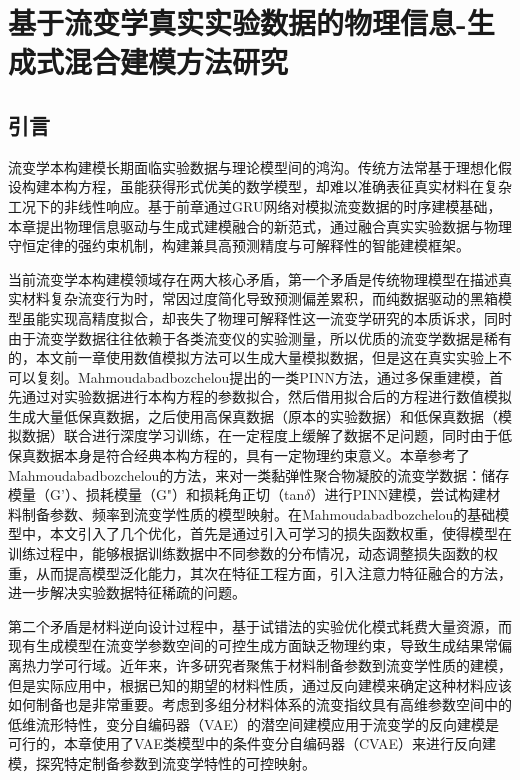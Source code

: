 \chapter{基于流变学真实实验数据的物理信息-生成式混合建模方法研究}
\section{引言}
流变学本构建模长期面临实验数据与理论模型间的鸿沟。传统方法常基于理想化假设构建本构方程，虽能获得形式优美的数学模型，却难以准确表征真实材料在复杂工况下的非线性响应。基于前章通过GRU网络对模拟流变数据的时序建模基础，本章提出物理信息驱动与生成式建模融合的新范式，通过融合真实实验数据与物理守恒定律的强约束机制，构建兼具高预测精度与可解释性的智能建模框架。

当前流变学本构建模领域存在两大核心矛盾，第一个矛盾是传统物理模型在描述真实材料复杂流变行为时，常因过度简化导致预测偏差累积，而纯数据驱动的黑箱模型虽能实现高精度拟合，却丧失了物理可解释性这一流变学研究的本质诉求，同时由于流变学数据往往依赖于各类流变仪的实验测量，所以优质的流变学数据是稀有的，本文前一章使用数值模拟方法可以生成大量模拟数据，但是这在真实实验上不可以复刻。Mahmoudabadbozchelou提出的一类PINN方法，通过多保重建模，首先通过对实验数据进行本构方程的参数拟合，然后借用拟合后的方程进行数值模拟生成大量低保真数据，之后使用高保真数据（原本的实验数据）和低保真数据（模拟数据）联合进行深度学习训练，在一定程度上缓解了数据不足问题，同时由于低保真数据本身是符合经典本构方程的，具有一定物理约束意义。本章参考了Mahmoudabadbozchelou的方法，来对一类黏弹性聚合物凝胶的流变学数据：储存模量（G'）、损耗模量（G"）和损耗角正切（tan$\delta$）进行PINN建模，尝试构建材料制备参数、频率到流变学性质的模型映射。在Mahmoudabadbozchelou的基础模型中，本文引入了几个优化，首先是通过引入可学习的损失函数权重，使得模型在训练过程中，能够根据训练数据中不同参数的分布情况，动态调整损失函数的权重，从而提高模型泛化能力，其次在特征工程方面，引入注意力特征融合的方法，进一步解决实验数据特征稀疏的问题。

第二个矛盾是材料逆向设计过程中，基于试错法的实验优化模式耗费大量资源，而现有生成模型在流变学参数空间的可控生成方面缺乏物理约束，导致生成结果常偏离热力学可行域。近年来，许多研究者聚焦于材料制备参数到流变学性质的建模，但是实际应用中，根据已知的期望的材料性质，通过反向建模来确定这种材料应该如何制备也是非常重要。考虑到多组分材料体系的流变指纹具有高维参数空间中的低维流形特性，变分自编码器（VAE）的潜空间建模应用于流变学的反向建模是可行的，本章使用了VAE类模型中的条件变分自编码器（CVAE）来进行反向建模，探究特定制备参数到流变学特性的可控映射。

